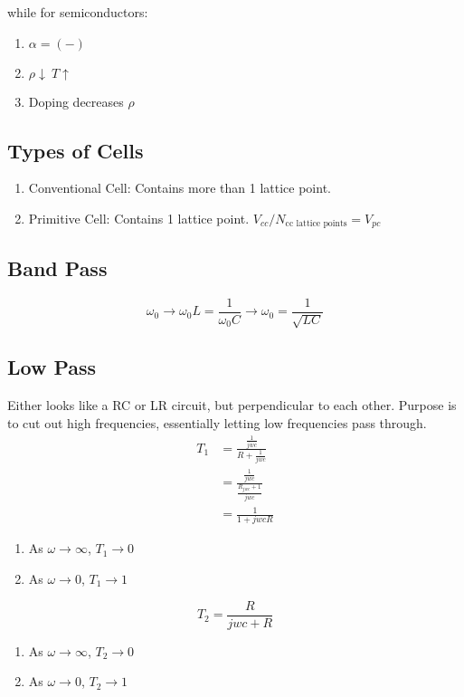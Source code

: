\documentclass[10pt,letter]{article}
\begin{document}
 while for semiconductors:
\begin{enumerate}
  \item $\alpha = (-)$
  \item $\rho \downarrow ~ T \uparrow$
  \item Doping decreases $\rho$
\end{enumerate}

\subsection{Types of Cells}
\begin{enumerate}
    \item Conventional Cell: Contains more than 1 lattice point.
    \item Primitive Cell: Contains 1 lattice point. $V_{cc} / N_{\textrm{cc lattice points}} = V_{pc}$
\end{enumerate}

\subsection{Band Pass}
\begin{equation}
 \omega_0 \rightarrow \omega_0L = \frac{1}{\omega_0 C} \rightarrow \omega_0 = \frac{1}{\sqrt{LC}}
\end{equation}

\subsection{Low Pass}
Either looks like a RC or LR circuit, but perpendicular to each other. Purpose is to cut out high frequencies, essentially letting low frequencies pass through.
\begin{align}
    T_1 &= \frac{\frac{1}{jwc}}{R + \frac{1}{jwc}}\\
    &= \frac{\frac{1}{jwc}}{\frac{R_{jwc} + 1}{jwc}}\\
    &= \frac{1}{1 + jwcR}
\end{align}
\begin{enumerate}
    \item As $\omega \rightarrow \infty$, $T_1 \rightarrow 0$
    \item As $\omega \rightarrow 0$, $T_1 \rightarrow 1$
\end{enumerate}
\begin{equation}
 T_2 = \frac{R}{jwc + R} 
\end{equation}
\begin{enumerate}
    \item As $\omega \rightarrow \infty$, $T_2 \rightarrow 0$
    \item As $\omega \rightarrow 0$, $T_2 \rightarrow 1$
\end{enumerate}
\end{document}
